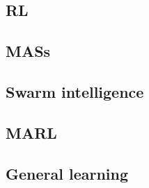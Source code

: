 \subsection{\Acl{RL}}\label{subsec:rl}

\subsection{\Aclp{MAS}}\label{subsec:mas}

\subsection{Swarm intelligence}\label{subsec:swarm-intelligence}

\subsection{\Acl{MARL}}\label{subsec:marl}

\subsection{General learning}\label{subsec:general-learning}
